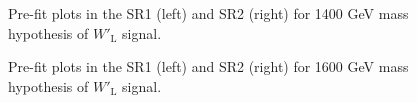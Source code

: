 \begin{figure}[H]
  \centering
  \caption{Pre-fit plots in the SR1 (left) and SR2 (right) for 1400 GeV mass hypothesis of $W'_{\text{L}}$ signal.}
  \label{fig:Prefit_WpLH1400_Asimov}
\end{figure}
\begin{figure}[H]
  \centering
  \caption{Pre-fit plots in the SR1 (left) and SR2 (right) for 1600 GeV mass hypothesis of $W'_{\text{L}}$ signal.}
  \label{fig:Prefit_WpLH1600_Asimov}
\end{figure}
